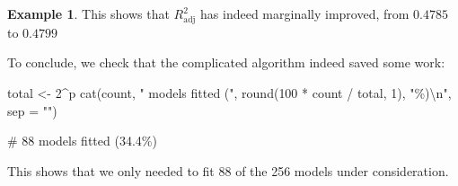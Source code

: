 \documentclass[
  a4paper,
]{article}
\newenvironment{Shaded}{\begin{snugshade}}{\end{snugshade}}
\newcommand{\AttributeTok}[1]{\textcolor[rgb]{0.77,0.63,0.00}{#1}}
\newcommand{\DecValTok}[1]{\textcolor[rgb]{0.00,0.00,0.81}{#1}}
\newcommand{\FunctionTok}[1]{\textcolor[rgb]{0.00,0.00,0.00}{#1}}
\newcommand{\NormalTok}[1]{#1}
\newcommand{\OtherTok}[1]{\textcolor[rgb]{0.56,0.35,0.01}{#1}}
\newcommand{\SpecialCharTok}[1]{\textcolor[rgb]{0.00,0.00,0.00}{#1}}
\newcommand{\StringTok}[1]{\textcolor[rgb]{0.31,0.60,0.02}{#1}}
\theoremstyle{definition}
\theoremstyle{definition}
\newtheorem{example}{Example}[section]
\theoremstyle{definition}
\theoremstyle{definition}
\theoremstyle{remark}
\begin{document}
\begin{example}
This shows that \(R^2_\mathrm{adj}\) has indeed marginally improved,
from \(0.4785\) to \(0.4799\)

To conclude, we check that the complicated algorithm indeed saved some work:

\begin{Shaded}
\begin{Highlighting}[]
\NormalTok{total }\OtherTok{\textless{}{-}} \DecValTok{2}\SpecialCharTok{\^{}}\NormalTok{p}
\FunctionTok{cat}\NormalTok{(count,}
    \StringTok{" models fitted ("}\NormalTok{, }\FunctionTok{round}\NormalTok{(}\DecValTok{100} \SpecialCharTok{*}\NormalTok{ count }\SpecialCharTok{/}\NormalTok{ total, }\DecValTok{1}\NormalTok{), }\StringTok{"\%)}\SpecialCharTok{\textbackslash{}n}\StringTok{"}\NormalTok{,}
    \AttributeTok{sep =} \StringTok{""}\NormalTok{)}
\end{Highlighting}
\end{Shaded}

\begin{Shaded}
\begin{Highlighting}[]
\NormalTok{\# 88 models fitted (34.4\%)}
\end{Highlighting}
\end{Shaded}

This shows that we only needed to fit 88 of the 256 models under consideration.
\end{example}
\end{document}
